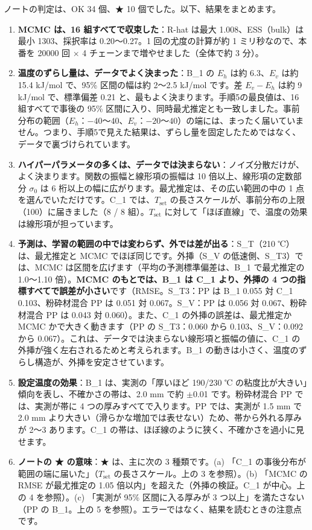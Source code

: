 \documentclass[paper=a4paper,fontsize=10.5pt,line_length=44zw,number_of_lines=38]{jlreq}
\newcommand{\Tset}{T_{\mathrm{set}}}
\newcommand{\Eh}{E_{h}}
\newcommand{\Ev}{E_{v}}
\begin{document}
ノートの判定は、OK 34 個、★ 10 個でした。以下、結果をまとめます。

\begin{enumerate}[itemsep=0.8ex,topsep=0.6ex]
\item \textbf{MCMC は、16 組すべてで収束した}：R-hat は最大 1.008、ESS（bulk）は最小 1303、採択率は 0.20〜0.27。1 回の尤度の計算が約 1 ミリ秒なので、本番を 20000 回 $\times$ 4 チェーンまで増やせました（全体で約 3 分）。
\item \textbf{温度のずらし量は、データでよく決まった}：B\_1 の $\Eh$ は約 6.3、$\Ev$ は約 15.4 kJ/mol で、95\% 区間の幅は約 2〜2.5 kJ/mol です。差 $\Ev-\Eh$ は約 9 kJ/mol で、標準偏差 0.21 と、最もよく決まります。手順5の最良値は、16 組すべてで事後の 95\% 区間に入り、同時最尤推定とも一致しました。事前分布の範囲（$\Eh$：$-40$〜$40$、$\Ev$：$-20$〜$40$）の端には、まったく届いていません。つまり、手順5で見えた結果は、ずらし量を固定したためではなく、データで裏づけられています。
\item \textbf{ハイパーパラメータの多くは、データでは決まらない}：ノイズ分散だけが、よく決まります。関数の振幅と線形項の振幅は 10 倍以上、線形項の定数部分 $\sigma_0$ は 6 桁以上の幅に広がります。最尤推定は、その広い範囲の中の 1 点を選んでいただけです。C\_1 では、$\Tset$ の長さスケールが、事前分布の上限（100）に届きました（8 / 8 組）。$\Tset$ に対して「ほぼ直線」で、温度の効果は線形項が担っています。
\item \textbf{予測は、学習の範囲の中では変わらず、外では差が出る}：S\_T（210 ℃）は、最尤推定と MCMC でほぼ同じです。外挿（S\_V の低速側、S\_T3）では、MCMC は区間を広げます（平均の予測標準偏差は、B\_1 で最尤推定の 1.0〜1.10 倍）。\textbf{MCMC のもとでは、B\_1 は C\_1 より、外挿の 4 つの指標すべてで誤差が小さい}です（RMSE。S\_T3：PP は B\_1 0.055 対 C\_1 0.103、粉砕材混合 PP は 0.051 対 0.067。S\_V：PP は 0.056 対 0.067、粉砕材混合 PP は 0.043 対 0.060）。また、C\_1 の外挿の誤差は、最尤推定か MCMC かで大きく動きます（PP の S\_T3：0.060 から 0.103、S\_V：0.092 から 0.067）。これは、データでは決まらない線形項と振幅の値に、C\_1 の外挿が強く左右されるためと考えられます。B\_1 の動きは小さく、温度のずらし構造が、外挿を安定させています。
\item \textbf{設定温度の効果}：B\_1 は、実測の「厚いほど 190/230 ℃ の粘度比が大きい」傾向を表し、不確かさの帯は、2.0 mm で約 $\pm$0.01 です。粉砕材混合 PP では、実測が帯に 4 つの厚みすべてで入ります。PP では、実測が 1.5 mm で 2.0 mm より大きい（滑らかな増加では表せない）ため、帯から外れる厚みが 2〜3 あります。C\_1 の帯は、ほぼ線のように狭く、不確かさを過小に見せます。
\item \textbf{ノートの ★ の意味}：★ は、主に次の 3 種類です。(a) 「C\_1 の事後分布が範囲の端に届いた」（$\Tset$ の長さスケール。上の 3 を参照）。(b) 「MCMC の RMSE が最尤推定の 1.05 倍以内」を超えた（外挿の検証。C\_1 が中心。上の 4 を参照）。(c) 「実測が 95\% 区間に入る厚みが 3 つ以上」を満たさない（PP の B\_1。上の 5 を参照）。エラーではなく、結果を読むときの注意点です。
\end{enumerate}
\end{document}
